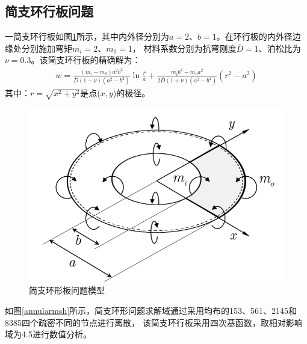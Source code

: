 \subsection{简支环行板问题}
一简支环行板如图\ref{annular}所示，其中内外径分别为$a=2$、$b=1$。在环行板的内外径边缘处分别施加弯矩$m_i=2$、$m_0=1$，
材料系数分别为抗弯刚度$\bar{D}=1$、泊松比为$\nu=0.3$。该简支环行板的精确解为：
\begin{equation}
\begin{split}
    w=\frac{(m_i-m_0)a^2b^2}{\bar D(1-\nu)(a^2-b^2)}\ln\frac{r}{a}+\frac{m_ib^2-m_oa^2}{2\bar D(1+\nu)(a^2-b^2)}(r^2-a^2)
\end{split}
\end{equation}
其中：$r=\sqrt{x^2+y^2}$是点($x,y$)的极径。
\begin{figure}[H]
    \centering
    \includegraphics[scale=0.7]{figure/PHR/A/annular.png}
    \caption{简支环形板问题模型}\label{annular}
\end{figure}
如图\ref{annularmsh}所示，简支环形问题求解域通过采用均布的153、561、2145和8385四个疏密不同的节点进行离散，
该简支环行板采用四次基函数，取相对影响域为4.5进行数值分析。\par
